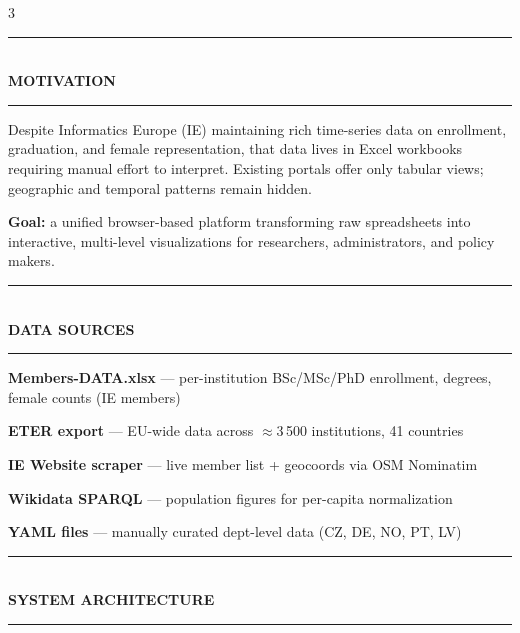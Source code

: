 \documentclass[a4paper,9pt]{article}
\newcommand{\sectiontitle}[1]{%
  \vspace{1pt}%
  {\color{primary}\rule{\linewidth}{1pt}}\\[-4pt]
  {\color{primary}\small\bfseries\MakeUppercase{#1}}\\[-8pt]
  {\color{secondary}\rule{\linewidth}{0.4pt}}%
  \vspace{2pt}%
}
\begin{document}
\vspace{-6pt}\begin{multicols}{3}


\sectiontitle{Motivation}

Despite Informatics Europe (IE) maintaining rich time-series data on enrollment,
graduation, and female representation, that data lives in Excel workbooks requiring
manual effort to interpret. Existing portals offer only tabular views; geographic
and temporal patterns remain hidden.

\textbf{Goal:} a unified browser-based platform transforming raw spreadsheets into
interactive, multi-level visualizations for researchers, administrators, and policy makers.

\vspace{2pt}
\sectiontitle{Data Sources}

\begin{tightitem}
  \item \textbf{Members-DATA.xlsx} — per-institution BSc/MSc/PhD enrollment, degrees, female counts (IE members)
  \item \textbf{ETER export} — EU-wide data across $\approx$3\,500 institutions, 41 countries
  \item \textbf{IE Website scraper} — live member list + geocoords via OSM Nominatim
  \item \textbf{Wikidata SPARQL} — population figures for per-capita normalization
  \item \textbf{YAML files} — manually curated dept-level data (CZ, DE, NO, PT, LV)
\end{tightitem}

\vspace{2pt}
\sectiontitle{System Architecture}

\begin{center}
\end{center}


\end{multicols}
\end{document}
